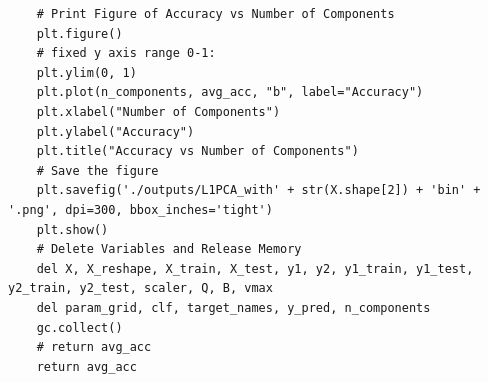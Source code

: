 \documentclass{cta-author}
\begin{document}
\begin{lstlisting}
    # Print Figure of Accuracy vs Number of Components
    plt.figure()
    # fixed y axis range 0-1:
    plt.ylim(0, 1)
    plt.plot(n_components, avg_acc, "b", label="Accuracy")
    plt.xlabel("Number of Components")
    plt.ylabel("Accuracy")
    plt.title("Accuracy vs Number of Components")
    # Save the figure
    plt.savefig('./outputs/L1PCA_with' + str(X.shape[2]) + 'bin' + '.png', dpi=300, bbox_inches='tight')
    plt.show()
    # Delete Variables and Release Memory
    del X, X_reshape, X_train, X_test, y1, y2, y1_train, y1_test, y2_train, y2_test, scaler, Q, B, vmax
    del param_grid, clf, target_names, y_pred, n_components
    gc.collect()
    # return avg_acc
    return avg_acc

\end{lstlisting}
\end{document}
